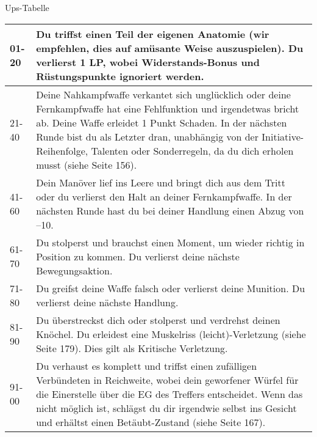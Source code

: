 \documentclass{article}
\begin{document}
\begin{multicols*}{3}
    
    \begin{slsframe}{Ups-Tabelle}        
            \begin{tabularx}{\linewidth}{lX}
                01-20 & Du triffst einen Teil der eigenen Anatomie (wir empfehlen, dies auf amüsante Weise auszuspielen). Du verlierst 1 LP, wobei Widerstands-Bonus und Rüstungspunkte ignoriert werden.  \\ \hline

                21-40 & Deine Nahkampfwaffe verkantet sich unglücklich oder deine Fernkampfwaffe hat eine Fehlfunktion und irgendetwas bricht ab. Deine Waffe erleidet 1 Punkt Schaden. In der nächsten Runde bist du als Letzter dran, unabhängig von der Initiative-Reihenfolge, Talenten oder Sonderregeln, da du dich erholen musst (siehe Seite 156).\\ \hline

                41-60 & Dein Manöver lief ins Leere und bringt dich aus dem Tritt oder du verlierst den Halt an deiner Fernkampfwaffe. In der nächsten Runde hast du bei deiner Handlung einen Abzug von –10.\\ \hline

                61-70 & Du stolperst und brauchst einen Moment, um wieder richtig in Position zu kommen. Du verlierst deine nächste Bewegungsaktion.  \\ \hline

                71-80 & Du greifst deine Waffe falsch oder verlierst deine Munition. Du verlierst deine nächste Handlung.  \\ \hline

                81-90 & Du überstreckst dich oder stolperst und verdrehst deinen Knöchel. Du erleidest eine Muskelriss (leicht)-Verletzung (siehe Seite 179). Dies gilt als Kritische Verletzung. \\ \hline

                91-00 & Du verhaust es komplett und triffst einen zufälligen Verbündeten in Reichweite, wobei dein geworfener Würfel für die Einerstelle über die EG des Treffers entscheidet. Wenn das nicht möglich ist, schlägst du dir irgendwie selbst ins Gesicht und erhältst einen Betäubt-Zustand (siehe Seite 167).

            \end{tabularx}        
    \end{slsframe}
    


\end{multicols*}
\end{document}
